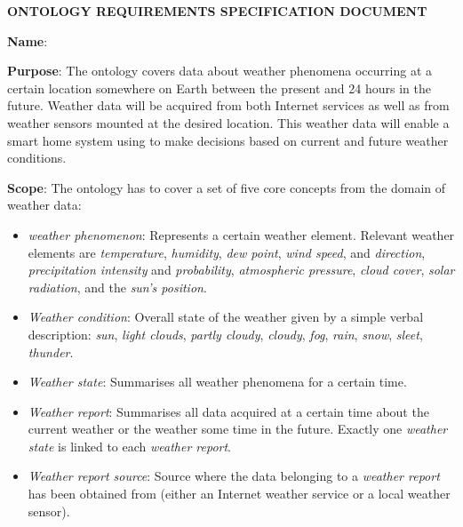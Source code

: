 \vspace{1em}

\begin{mdframed}[linewidth=.6pt]
\setlength{\parindent}{0pt}
\vspace{.4cm}

\MakeUppercase{\textbf{Ontology Requirements Specification Document}}

\vspace{.6cm}

\textbf{Name}: \smarthomeweather

\vspace{.3cm}

\textbf{Purpose}: The ontology covers data about weather phenomena occurring at a certain location somewhere on Earth between the present and 24 hours in the future. Weather data will be acquired from both Internet services as well as from weather sensors mounted at the desired location. This weather data will enable a smart home system using \smarthomeweather to make decisions based on current and future weather conditions.

\vspace{.3cm}

\textbf{Scope}: The ontology has to cover a set of five core concepts from the domain of weather data:

\begin{itemize}
  \item \emph{weather phenomenon}: Represents a certain weather element. Relevant weather elements are \emph{temperature}, \emph{humidity}, \emph{dew point}, \emph{wind speed}, and \emph{direction}, \emph{precipitation intensity} and \emph{probability}, \emph{atmospheric pressure}, \emph{cloud cover}, \emph{solar radiation}, and the \emph{sun's position}.
  \item \emph{Weather condition}: Overall state of the weather given by a simple verbal description: \emph{sun}, \emph{light clouds}, \emph{partly cloudy}, \emph{cloudy}, \emph{fog}, \emph{rain}, \emph{snow}, \emph{sleet}, \emph{thunder}.
  \item \emph{Weather state}: Summarises all weather phenomena for a certain time. 
  \item \emph{Weather report}: Summarises all data acquired at a certain time about the current weather or the weather some time in the future. Exactly one \emph{weather state} is linked to each \emph{weather report}.
  \item \emph{Weather report source}: Source where the data belonging to a \emph{weather report} has been obtained from (either an Internet weather service or a local weather sensor).
\end{itemize}


\end{mdframed}
